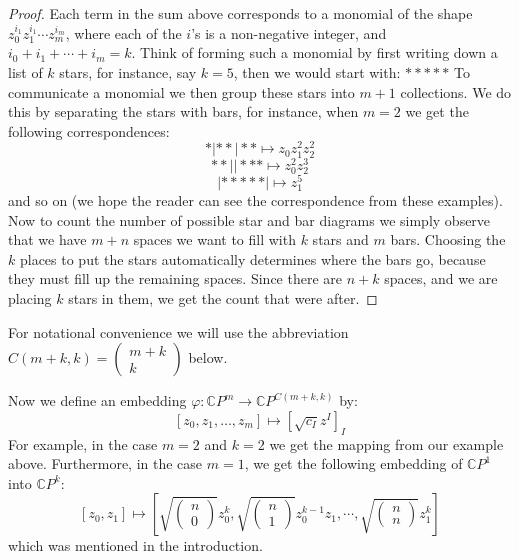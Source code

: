 \documentclass[11pt]{amsart}
\theoremstyle{definition}
\def \CP{ \mathbb{C}P }
\begin{document}
\begin{proof} Each term in the sum above corresponds to a monomial of the shape $z_0^{i_1} z_1^{i_1} \cdots z_m^{i_m}$, where each of the $i$'s is a non-negative integer, and $i_0 + i_1 + \cdots + i_m = k$. Think of forming such a monomial by first writing down a list of $k$ stars, for instance, say $k=5$, then we would start with:
%
$\ast \ast \ast \ast \ast$
%
To communicate a monomial we then group these stars into $m+1$ collections.  We do this by separating the stars with bars, for instance, when $m=2$ we get the following correspondences:  
%
$$ *|**|** \mapsto z_0 z_1^2 z_2^2 $$
$$ **||*** \mapsto z_0^2 z_2^3 $$
$$ |*****| \mapsto z_1^5 $$
%
and so on (we hope the reader can see the correspondence from these examples).  Now to count the number of possible star and bar diagrams we simply observe that we have $m+n$ spaces we want to fill with $k$ stars and $m$ bars.  Choosing the $k$ places to put the stars automatically determines where the bars go, because they must fill up the remaining spaces.  Since there are $n+k$ spaces, and we are placing $k$ stars in them, we get the count that were after.
\end{proof}

For notational convenience we will use the abbreviation $C(m+k,k) = \left( \begin{array}{c} m + k \\ k \end{array} \right)$ below.

Now we define an embedding $\varphi : \CP^m \rightarrow \CP^{C(m+k,k)}$ by:
%
$$ [z_0, z_1, \ldots, z_m ] \mapsto [ \sqrt{ c_I } z^I ]_{I} $$
%
For example, in the case $m=2$ and $k=2$ we get the mapping from our example above.  Furthermore, in the case $m=1$, we get the following embedding of $\CP^1$ into $\CP^k$:
%
$$ [z_0, z_1] \mapsto \left[ \sqrt{ \left( \begin{array}{c} n \\ 0 \end{array} \right) } z_0^k, \sqrt{ \left( \begin{array}{c} n \\ 1 \end{array} \right) } z_0^{k-1} z_1, \cdots, \sqrt{ \left( \begin{array}{c} n \\ n \end{array} \right) } z_1^k \right] $$ 
%
which was mentioned in the introduction.
\end{document}
